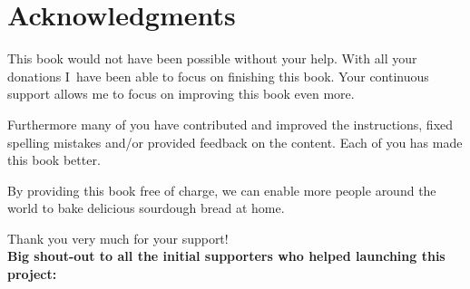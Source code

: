 \chapter{Acknowledgments}%
\label{ch:Acknowledgments}
This book would not have been possible without your help.
With all your donations I~have been able to focus on finishing
this book. Your continuous support allows me to focus
on improving this book even more.

Furthermore many of you have contributed and improved the
instructions, fixed spelling mistakes and/or provided
feedback on the content. Each of you has made this book
better.

By providing this book free of charge,
we can enable more people around the world to bake delicious sourdough
bread at home.

Thank you very much for your support!\\

\textbf{Big shout-out to all the initial supporters who helped launching this
project:\\}


